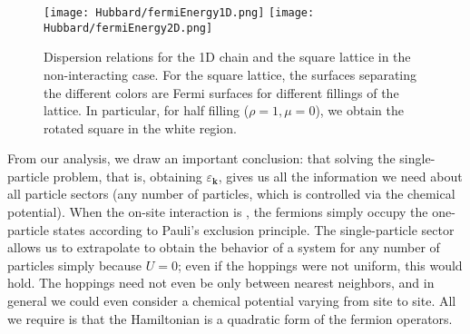 \begin{figure}[H]
\texttt{[image: Hubbard/fermiEnergy1D.png]}
\hspace{-9mm}
\texttt{[image: Hubbard/fermiEnergy2D.png]}
	\caption[Dispersion relations for the \acs{1D} chain and the square lattice in the non-interacting case.]{Dispersion relations for the \acs{1D} chain and the square lattice in the non-interacting case.
	For the square lattice, the surfaces separating the different colors are Fermi surfaces for different fillings of the lattice. In particular, for half filling ($\rho = 1, \mu = 0$), we obtain the rotated square in the white region.}
	\label{fig:fermi1D}
\end{figure}

From our analysis, we draw an important conclusion: that solving the single-particle problem, that is, obtaining $\varepsilon_{\bm k}$, gives us all the information we need about all particle sectors (any number of particles, which is controlled via the chemical potential).
When the on-site interaction is , the fermions simply occupy the one-particle states according to Pauli's exclusion principle.
The single-particle sector allows us to extrapolate to obtain the behavior of a system for any number of particles simply because $U = 0$; even if the hoppings were not uniform, this would hold.
The hoppings need not even be only between nearest neighbors, and in general we could even consider a chemical potential varying from site to site.
All we require is that the Hamiltonian is a quadratic form of the fermion operators.
